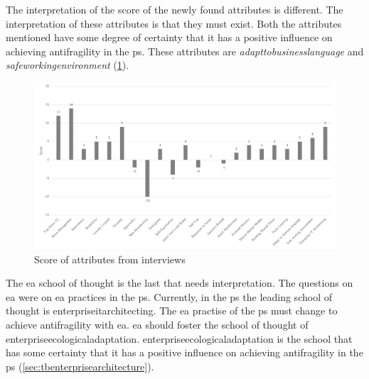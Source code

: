 The interpretation of the score of the newly found \glspl{attribute} is different. The interpretation of these \glspl{attribute} is that they must exist. Both the \glspl{attribute} mentioned have some degree of certainty that it has a positive influence on achieving \gls{antifragility} in the \gls{ps}. These attributes are \textit{\gls{adapttobusinesslanguage}} and \textit{\gls{safeworkingenvironment}} (\cref{fig:scoreofattributes}).
\begin{figure}[H]
	\centering
	\includegraphics[width=\textwidth]{images/scoreofattributes}
	\caption[Score of attributes from interviews]{Score of attributes from interviews}
	\label{fig:scoreofattributes}
\end{figure}
The \acrshort{ea} school of thought is the last that needs interpretation. The questions on \acrshort{ea} were on \acrshort{ea} practices in the \gls{ps}. Currently, in the \gls{ps} the leading school of thought is \gls{enterpriseitarchitecting}. The \acrshort{ea} practise of the \gls{ps} must change to achieve \gls{antifragility} with \acrshort{ea}. \acrshort{ea} should foster the school of thought of \gls{enterpriseecologicaladaptation}. \Gls{enterpriseecologicaladaptation} is the school that has some certainty that it has a positive influence on achieving \gls{antifragility} in the \gls{ps}  (\cref{sec:tbenterprisearchitecture}).

